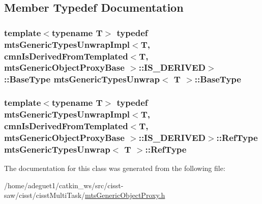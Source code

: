 \subsection{Member Typedef Documentation}
\hypertarget{classmts_generic_types_unwrap_a380693b0f12de3c3610bbb252b6fe082}{
\subsubsection[{Base\-Type}]{\setlength{\rightskip}{0pt plus 5cm}template$<$typename T$>$ typedef {\bf mts\-Generic\-Types\-Unwrap\-Impl}$<$T, {\bf cmn\-Is\-Derived\-From\-Templated}$<$T, {\bf mts\-Generic\-Object\-Proxy\-Base} $>$\-::I\-S\-\_\-\-D\-E\-R\-I\-V\-E\-D$>$\-::{\bf Base\-Type} {\bf mts\-Generic\-Types\-Unwrap}$<$ T $>$\-::{\bf Base\-Type}}}\label{classmts_generic_types_unwrap_a380693b0f12de3c3610bbb252b6fe082}
\hypertarget{classmts_generic_types_unwrap_a24e5f78383cd6567646fcdc413d02420}{
\subsubsection[{Ref\-Type}]{\setlength{\rightskip}{0pt plus 5cm}template$<$typename T$>$ typedef {\bf mts\-Generic\-Types\-Unwrap\-Impl}$<$T, {\bf cmn\-Is\-Derived\-From\-Templated}$<$T, {\bf mts\-Generic\-Object\-Proxy\-Base} $>$\-::I\-S\-\_\-\-D\-E\-R\-I\-V\-E\-D$>$\-::{\bf Ref\-Type} {\bf mts\-Generic\-Types\-Unwrap}$<$ T $>$\-::{\bf Ref\-Type}}}\label{classmts_generic_types_unwrap_a24e5f78383cd6567646fcdc413d02420}


The documentation for this class was generated from the following file\-:\begin{DoxyCompactItemize}
\item 
/home/adeguet1/catkin\-\_\-ws/src/cisst-\/saw/cisst/cisst\-Multi\-Task/\hyperlink{mts_generic_object_proxy_8h}{mts\-Generic\-Object\-Proxy.\-h}\end{DoxyCompactItemize}

